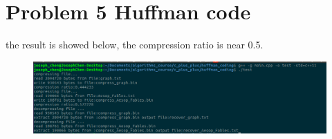 \section{Problem 5 Huffman code}
the result is showed below, the compression ratio is near 0.5.
\begin{figure}[H]
	\centering
	\includegraphics[width=\textwidth, height = 0.25\textheight]{./work3/huffman}
\end{figure}
 